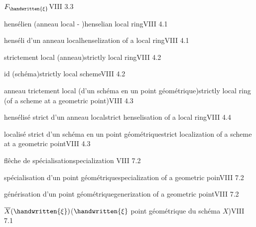 $F_{\handwritten{\xi}}$\qquad VIII 3.3

hensélien (anneau local - )\quad henselian local ring\quad VIII 4.1

 henséli d'un anneau local\quad henselization of a local ring\quad VIII 4.1

strictement local (anneau)\quad strictly local ring\quad VIII 4.2

 id  (schéma)\quad strictly local scheme\quad VIII 4.2

anneau trictement local (d'un schéma en un point géométrique)\quad strictly local ring (of a scheme at a geometric point)\quad VIII 4.3

hensélisé strict d'un anneau local\quad strict hens\deleted{\unsure{\'{}}}elisation of a local ring\quad VIII 4.4

localisé strict d'un schéma en un point géométrique\quad strict localization of a scheme at a geometric point\quad VIII 4.3

flêche de spécialisation\quad specialization \quad VIII 7.2

spécialisation d'un point géométrique\quad specialization of a geometric poin\quad VIII 7.2

générisation d'un point géométrique\quad generization of a geometric point\quad VIII 7.2

$\overline{X}(\handwritten{\xi})$\quad ($\handwritten{\xi}$ point géométrique du schéma $X$)\quad VIII 7.1

